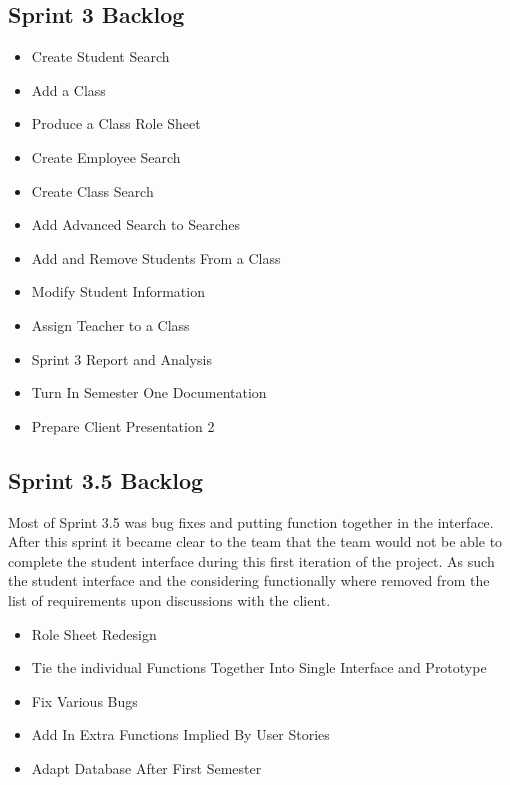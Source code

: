 \subsection{Sprint 3 Backlog}
\begin{itemize}
\item Create Student Search
\item Add a Class
\item Produce a Class Role Sheet
\item Create Employee Search
\item Create Class Search
\item Add Advanced Search to Searches
\item Add and Remove Students From a Class 
\item Modify Student Information
\item Assign Teacher to a Class
\item Sprint 3 Report and Analysis
\item Turn In Semester One Documentation
\item Prepare Client Presentation 2  
\end{itemize}

\subsection{Sprint 3.5 Backlog}
Most of Sprint 3.5 was bug fixes and putting function together in the interface. After this sprint it became clear to the team that the team would not be able to complete the student interface during this first iteration of the project. As such the student interface and the considering functionally where removed from the list of requirements upon discussions with the client.

\begin{itemize}
\item Role Sheet Redesign 
\item Tie the individual Functions Together Into Single Interface and Prototype 
\item Fix Various Bugs
\item Add In Extra Functions Implied By User Stories
\item Adapt Database After First Semester 
\end{itemize}

